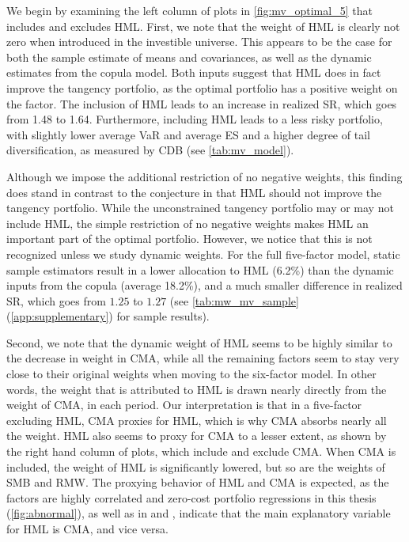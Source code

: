 We begin by examining the left column of plots in \autoref{fig:mv_optimal_5} that includes and excludes HML. First, we note that the weight of HML is clearly not zero when introduced in the investible universe. This appears to be the case for both the sample estimate of means and covariances, as well as the dynamic estimates from the copula model. Both inputs suggest that HML does in fact improve the tangency portfolio, as the optimal portfolio has a positive weight on the factor. The inclusion of HML leads to an increase in realized SR, which goes from 1.48 to 1.64. Furthermore, including HML leads to a less risky portfolio, with slightly lower average VaR and average ES and a higher degree of tail diversification, as measured by CDB (see \autoref{tab:mv_model}).

Although we impose the additional restriction of no negative weights, this finding does stand in contrast to the conjecture in \textcite{FF2015} that HML should not improve the tangency portfolio. While the unconstrained tangency portfolio may or may not include HML, the simple restriction of no negative weights makes HML an important part of the optimal portfolio. However, we notice that this is not recognized unless we study dynamic weights. For the full five-factor model, static sample estimators result in a lower allocation to HML (6.2\%) than the dynamic inputs from the copula (average 18.2\%), and a much smaller difference in realized SR, which goes from $1.25$ to $1.27$ (see \autoref{tab:mw_mv_sample} (\autoref{app:supplementary}) for sample results).

Second, we note that the dynamic weight of HML seems to be highly similar to the decrease in weight in CMA, while all the remaining factors seem to stay very close to their original weights when moving to the six-factor model. In other words, the weight that is attributed to HML is drawn nearly directly from the weight of CMA, in each period. Our interpretation is that in a five-factor excluding HML, CMA proxies for HML, which is why CMA absorbs nearly all the weight. HML also seems to proxy for CMA to a lesser extent, as shown by the right hand column of plots, which include and exclude CMA. When CMA is included, the weight of HML is significantly lowered, but so are the weights of SMB and RMW. The proxying behavior of HML and CMA is expected, as the factors are highly correlated and zero-cost portfolio regressions in this thesis (\autoref{fig:abnormal}), as well as in \textcite{FF2015} and \textcite{Asness2015}, indicate that the main explanatory variable for HML is CMA, and vice versa.

